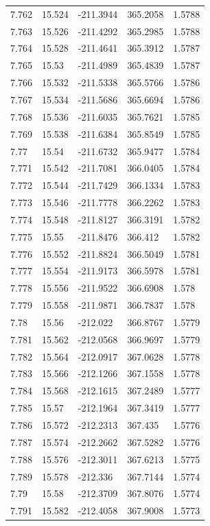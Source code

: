 \begin{tabular}{lllll}
7.762 & 15.524 & -211.3944 & 365.2058 & 1.5788 \\
7.763 & 15.526 & -211.4292 & 365.2985 & 1.5788 \\
7.764 & 15.528 & -211.4641 & 365.3912 & 1.5787 \\
7.765 & 15.53 & -211.4989 & 365.4839 & 1.5787 \\
7.766 & 15.532 & -211.5338 & 365.5766 & 1.5786 \\
7.767 & 15.534 & -211.5686 & 365.6694 & 1.5786 \\
7.768 & 15.536 & -211.6035 & 365.7621 & 1.5785 \\
7.769 & 15.538 & -211.6384 & 365.8549 & 1.5785 \\
7.77 & 15.54 & -211.6732 & 365.9477 & 1.5784 \\
7.771 & 15.542 & -211.7081 & 366.0405 & 1.5784 \\
7.772 & 15.544 & -211.7429 & 366.1334 & 1.5783 \\
7.773 & 15.546 & -211.7778 & 366.2262 & 1.5783 \\
7.774 & 15.548 & -211.8127 & 366.3191 & 1.5782 \\
7.775 & 15.55 & -211.8476 & 366.412 & 1.5782 \\
7.776 & 15.552 & -211.8824 & 366.5049 & 1.5781 \\
7.777 & 15.554 & -211.9173 & 366.5978 & 1.5781 \\
7.778 & 15.556 & -211.9522 & 366.6908 & 1.578 \\
7.779 & 15.558 & -211.9871 & 366.7837 & 1.578 \\
7.78 & 15.56 & -212.022 & 366.8767 & 1.5779 \\
7.781 & 15.562 & -212.0568 & 366.9697 & 1.5779 \\
7.782 & 15.564 & -212.0917 & 367.0628 & 1.5778 \\
7.783 & 15.566 & -212.1266 & 367.1558 & 1.5778 \\
7.784 & 15.568 & -212.1615 & 367.2489 & 1.5777 \\
7.785 & 15.57 & -212.1964 & 367.3419 & 1.5777 \\
7.786 & 15.572 & -212.2313 & 367.435 & 1.5776 \\
7.787 & 15.574 & -212.2662 & 367.5282 & 1.5776 \\
7.788 & 15.576 & -212.3011 & 367.6213 & 1.5775 \\
7.789 & 15.578 & -212.336 & 367.7144 & 1.5774 \\
7.79 & 15.58 & -212.3709 & 367.8076 & 1.5774 \\
7.791 & 15.582 & -212.4058 & 367.9008 & 1.5773 \\

\end{tabular}
